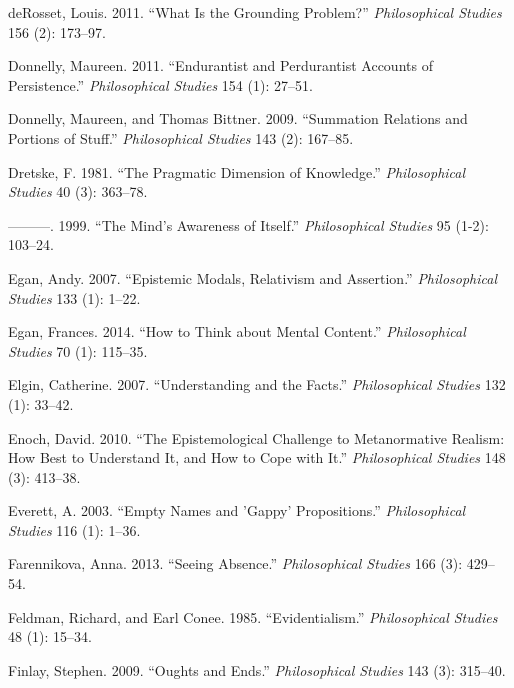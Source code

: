 \documentclass[
  10pt,
  letterpaper,
  DIV=11,
  numbers=noendperiod,
  twoside]{scrartcl}
\newlength{\cslhangindent}
\newenvironment{CSLReferences}[2] %
 {\begin{list}{}{%
  \setlength{\itemindent}{0pt}
  \setlength{\leftmargin}{0pt}
  \setlength{\parsep}{0pt}
  \ifodd #1
   \setlength{\leftmargin}{\cslhangindent}
   \setlength{\itemindent}{-1\cslhangindent}
  \fi
  \setlength{\itemsep}{#2\baselineskip}}}
 {\end{list}}
\begin{document}
\begin{CSLReferences}{1}{0}
deRosset, Louis. 2011. {``What Is the Grounding Problem?''}
\emph{Philosophical Studies} 156 (2): 173--97.

Donnelly, Maureen. 2011. {``Endurantist and Perdurantist Accounts of
Persistence.''} \emph{Philosophical Studies} 154 (1): 27--51.

Donnelly, Maureen, and Thomas Bittner. 2009. {``Summation Relations and
Portions of Stuff.''} \emph{Philosophical Studies} 143 (2): 167--85.

Dretske, F. 1981. {``The Pragmatic Dimension of Knowledge.''}
\emph{Philosophical Studies} 40 (3): 363--78.

---------. 1999. {``The Mind's Awareness of Itself.''}
\emph{Philosophical Studies} 95 (1-2): 103--24.

Egan, Andy. 2007. {``Epistemic Modals, Relativism and Assertion.''}
\emph{Philosophical Studies} 133 (1): 1--22.

Egan, Frances. 2014. {``How to Think about Mental Content.''}
\emph{Philosophical Studies} 70 (1): 115--35.

Elgin, Catherine. 2007. {``Understanding and the Facts.''}
\emph{Philosophical Studies} 132 (1): 33--42.

Enoch, David. 2010. {``The Epistemological Challenge to Metanormative
Realism: How Best to Understand It, and How to Cope with It.''}
\emph{Philosophical Studies} 148 (3): 413--38.

Everett, A. 2003. {``Empty Names and 'Gappy' Propositions.''}
\emph{Philosophical Studies} 116 (1): 1--36.

Farennikova, Anna. 2013. {``Seeing Absence.''} \emph{Philosophical
Studies} 166 (3): 429--54.

Feldman, Richard, and Earl Conee. 1985. {``Evidentialism.''}
\emph{Philosophical Studies} 48 (1): 15--34.

Finlay, Stephen. 2009. {``Oughts and Ends.''} \emph{Philosophical
Studies} 143 (3): 315--40.


\end{CSLReferences}
\end{document}
